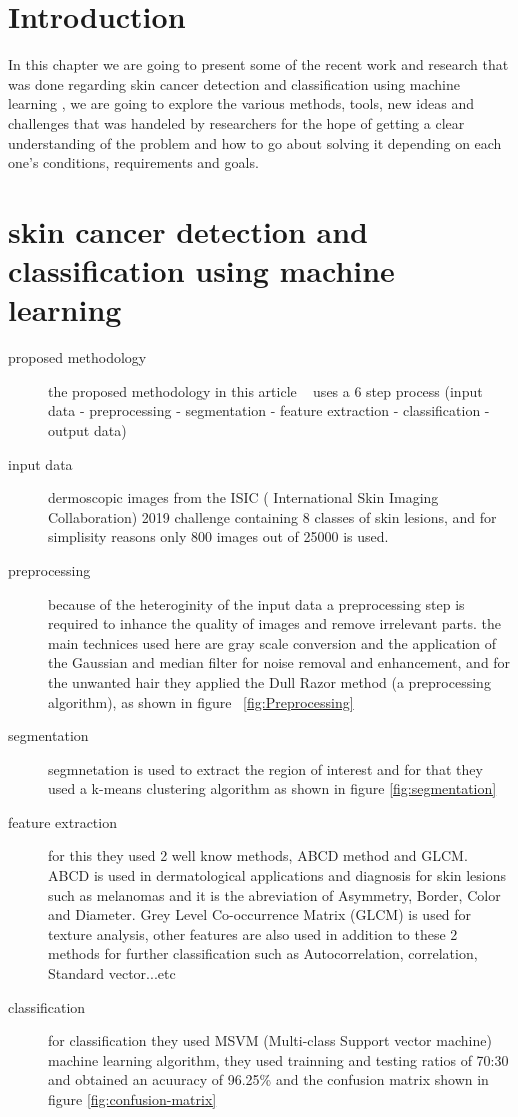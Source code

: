 \section{Introduction}
In this chapter we are going to present some of the recent work and research that was done regarding skin cancer detection and classification using machine learning , we are going to explore the various methods, tools, new ideas and challenges that was handeled by researchers for the hope of getting a clear understanding of the problem and how to go about solving it depending on each one's conditions, requirements and goals.



\section{skin cancer detection and classification using machine learning}
\begin{description}
    \item [proposed methodology]
    the proposed methodology in this article ~\cite{Krishna2020} uses a 6 step process (input data - preprocessing - segmentation - feature extraction - classification - output data)
    \item [input data] 
        dermoscopic images from the ISIC ( International Skin Imaging Collaboration) 2019 challenge containing 8 classes of skin lesions, and for simplisity reasons only 800 images out of 25000 is used.
    
    \item [preprocessing]
        because of the heteroginity of the input data a preprocessing step is required to inhance the quality of images and remove irrelevant parts. the main technices used here are gray scale conversion and the application of the Gaussian and median filter for noise removal and enhancement, and for the unwanted hair they applied the Dull Razor method (a preprocessing algorithm), as shown in figure ~\ref{fig:Preprocessing}

    \item [segmentation]
        segmnetation is used to extract the region of interest and for that they used a k-means clustering algorithm as shown in figure \ref{fig:segmentation}
        
    \item [feature extraction]
        for this they used 2 well know methods, ABCD method and GLCM. ABCD is used in dermatological applications and diagnosis for skin lesions such as melanomas and it is the abreviation of Asymmetry, Border, Color and Diameter. Grey Level Co-occurrence Matrix (GLCM) is used for texture analysis, other features are also used in addition to these 2 methods for further classification such as Autocorrelation, correlation, Standard vector...etc
    
    \item [classification]
        for classification they used MSVM (Multi-class Support vector machine) machine learning algorithm, they used trainning and testing ratios of 70:30 and obtained an acuuracy of 96.25\% and the confusion matrix shown in figure \ref{fig:confusion-matrix}
\end{description}

